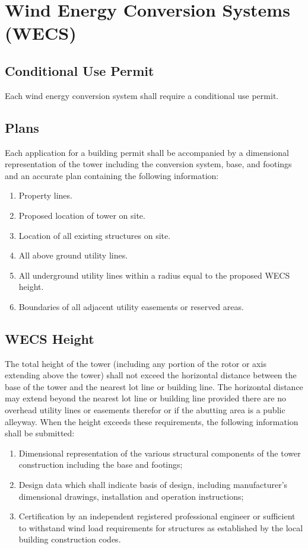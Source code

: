 \section{Wind Energy Conversion Systems (WECS)}
\subsection{Conditional Use Permit}
Each wind energy conversion system shall require a conditional use permit.
\subsection{Plans}
Each application for a building permit shall be accompanied by a dimensional representation of the tower including the conversion system, base, and footings and an accurate plan containing the following information:
\begin{enumerate}[{\indent}1)]
    \item Property lines.
    \item Proposed location of tower on site.
    \item Location of all existing structures on site.
    \item All above ground utility lines.
    \item All underground utility lines within a radius equal to the proposed WECS height.
    \item Boundaries of all adjacent utility easements or reserved areas.
\end{enumerate}
\subsection{WECS Height}
The total height of the tower (including any portion of the rotor or axis extending above the tower) shall not exceed the horizontal distance between the base of the tower and the nearest lot line or building line. The horizontal distance may extend beyond the nearest lot line or building line provided there are no overhead utility lines or easements therefor or if the abutting area is a public alleyway. When the height exceeds these requirements, the following information shall be submitted:
\begin{enumerate}[{\indent}1)]
    \item Dimensional representation of the various structural components of the tower construction including the base and footings;
    \item Design data which shall indicate basis of design, including manufacturer’s dimensional drawings, installation and operation instructions;
    \item Certification by an independent registered professional engineer or sufficient to withstand wind load requirements for structures as established by the local building construction codes.
\end{enumerate}
